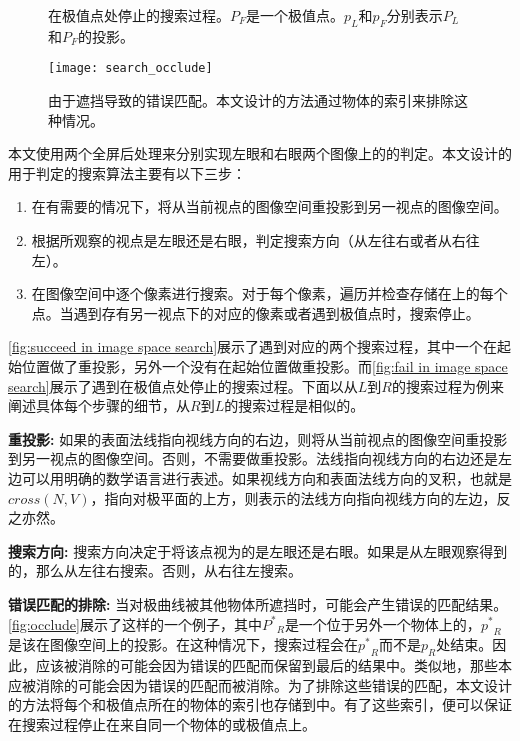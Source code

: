 {\begin{figure}[tbh]
    \centering
    \hfil
    \caption{在极值点处停止的搜索过程。$P_F$是一个极值点。$p_L$和$p_F$分别表示$P_L$和$P_F$的投影。} \label{fig:fail in image space search}
\end{figure}

\begin{figure}[tbh]
    \centering
    \texttt{[image: search\_occlude]}
    \caption{\label{fig:occlude}
    由于遮挡导致的错误匹配。本文设计的方法通过物体的索引来排除这种情况。}
\end{figure}

本文使用两个全屏后处理来分别实现左眼和右眼两个图像上的\epsl{}的判定。本文设计的用于\epsl{}判定的搜索算法主要有以下三步：

\begin{enumerate}
    \item 在有需要的情况下，将\conp{}从当前视点的图像空间重投影到另一视点的图像空间。
    \item 根据\conp{}所观察的视点是左眼还是右眼，判定搜索方向（从左往右或者从右往左）。
    \item 在图像空间中逐个像素进行搜索。对于每个像素，遍历并检查存储在\ppll{}上的每个点。当遇到存有另一视点下的对应\conp{}的像素或者遇到极值点时，搜索停止。
\end{enumerate}

\autoref{fig:succeed in image space search}展示了遇到对应\conp{}的两个搜索过程，其中一个在起始位置做了重投影，另外一个没有在起始位置做重投影。而\autoref{fig:fail in image space search}展示了遇到在极值点处停止的搜索过程。下面以从$L$到$R$的搜索过程为例来阐述具体每个步骤的细节，从$R$到$L$的搜索过程是相似的。

{\textbf{重投影:} 如果\conp{}的表面法线指向视线方向的右边，则将\conp{}从当前视点的图像空间重投影到另一视点的图像空间。否则，不需要做重投影。法线指向视线方向的右边还是左边可以用明确的数学语言进行表述。如果视线方向和表面法线方向的叉积，也就是$cross(N, V)$，指向对极平面的上方，则表示\conp{}的法线方向指向视线方向的左边，反之亦然。

\textbf{搜索方向:} 搜索方向决定于将该点视为\conp{}的是左眼还是右眼。如果\conp{}是从左眼观察得到的，那么从左往右搜索。否则，从右往左搜索。

\textbf{错误匹配的排除:} 当对极曲线被其他物体所遮挡时，可能会产生错误的匹配结果。\autoref{fig:occlude}展示了这样的一个例子，其中${P^*}_R$是一个位于另外一个物体上的\conp{}，${p^*}_R$是该\conp{}在图像空间上的投影。在这种情况下，搜索过程会在${p^*}_R$而不是$p_R$处结束。因此，应该被消除的\conp{}可能会因为错误的匹配而保留到最后的结果中。类似地，那些本应被消除的\conp{}可能会因为错误的匹配而被消除。为了排除这些错误的匹配，本文设计的方法将每个\conp{}和极值点所在的物体的索引也存储到\ppll{}中。有了这些索引，便可以保证在搜索过程停止在来自同一个物体的\conp{}或极值点上。

}}
